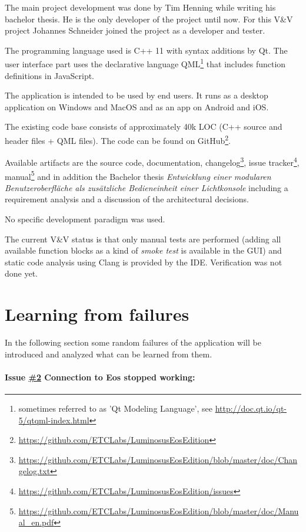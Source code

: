 \documentclass{scrreprt}
\begin{document}
The main project development was done by Tim Henning while writing his bachelor thesis. He is the only developer of the project until now. For this V\&V project Johannes Schneider joined the project as a developer and tester.

The programming language used is C++ 11 with syntax additions by Qt. The user interface part uses the declarative language QML\footnote{ sometimes referred to as 'Qt Modeling Language', see \url{http://doc.qt.io/qt-5/qtqml-index.html}} that includes function definitions in JavaScript.

The application is intended to be used by end users. It runs as a desktop application on Windows and MacOS and as an app on Android and iOS.

The existing code base consists of approximately 40k LOC (C++ source and header files + QML files). The code can be found on GitHub\footnote{\url{https://github.com/ETCLabs/LuminosusEosEdition}}.

Available artifacts are the source code, documentation, changelog\footnote{\url{https://github.com/ETCLabs/LuminosusEosEdition/blob/master/doc/Changelog.txt}}, issue tracker\footnote{\url{https://github.com/ETCLabs/LuminosusEosEdition/issues}}, manual\footnote{\url{https://github.com/ETCLabs/LuminosusEosEdition/blob/master/doc/Manual_en.pdf}} and in addition the Bachelor thesis \textit{Entwicklung einer modularen Benutzeroberfl\"ache als zus\"atzliche Bedieneinheit einer Lichtkonsole} including a requirement analysis and a discussion of the architectural decisions.

No specific development paradigm was used.

The current V\&V status is that only manual tests are performed (adding all available function blocks as a kind of \textit{smoke test} is available in the GUI) and static code analysis using Clang is provided by the IDE. Verification was not done yet.

\section{Learning from failures}

In the following section some random failures of the application will be introduced and analyzed what can be learned from them.

\paragraph{Issue \href{https://github.com/ETCLabs/LuminosusEosEdition/issues/2}{\#2} Connection to Eos stopped working:}
\end{document}
